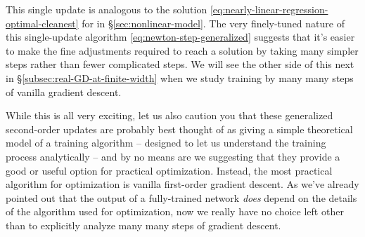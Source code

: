 {This single update is analogous to the  solution \eqref{eq:nearly-linear-regression-optimal-cleanest} for  in \S\ref{sec:nonlinear-model}.
The very finely-tuned nature of this single-update algorithm \eqref{eq:newton-step-generalized} suggests that it's easier to make the fine adjustments required to reach a solution by taking many simpler steps rather than fewer complicated steps.
We will see the other side of this next in \S\ref{subsec:real-GD-at-finite-width} when we study training by many many steps of vanilla gradient descent.
}







While this is all very exciting, let us also caution you that these generalized second-order updates are probably best thought of as giving a simple theoretical model of a training algorithm -- designed to let us understand the training process analytically -- and by no means are we suggesting that they provide a good or useful option for practical optimization.
Instead, the most practical algorithm for optimization is vanilla first-order gradient descent. As we've already pointed out that the output of a fully-trained network  \emph{does} depend on the details of the algorithm used for optimization,
 now we really have no choice left other than to explicitly analyze many many steps of gradient descent.

